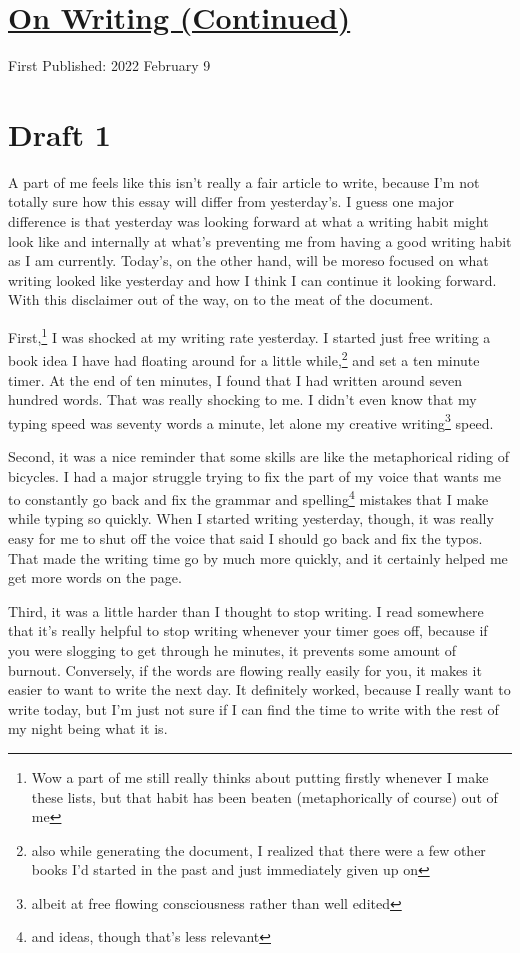 \documentclass[12pt]{article}[titlepage]
\newcommand{\1}{\={a}}
\newcommand{\2}{\={e}}
\newcommand{\3}{\={\i}}
\newcommand{\4}{\=o}
\newcommand{\5}{\=u}
\newcommand{\6}{\={A}}
\renewcommand{\,}{\textsuperscript{,}}
\begin{document}
\doublespacing
\section{\href{writing-2.html}{On Writing (Continued)}}
First Published: 2022 February 9

\section{Draft 1}
A part of me feels like this isn't really a fair article to write, because I'm not totally sure how this essay will differ from yesterday's.
I guess one major difference is that yesterday was looking forward at what a writing habit might look like and internally at what's preventing me from having a good writing habit as I am currently.
Today's, on the other hand, will be moreso focused on what writing looked like yesterday and how I think I can continue it looking forward.
With this disclaimer out of the way, on to the meat of the document.

First,\footnote{Wow a part of me still really thinks about putting firstly whenever I make these lists, but that habit has been beaten (metaphorically of course) out of me} I was shocked at my writing rate yesterday.
I started just free writing a book idea I have had floating around for a little while,\footnote{also while generating the document, I realized that there were a few other books I'd started in the past and just immediately given up on} and set a ten minute timer.
At the end of ten minutes, I found that I had written around seven hundred words.
That was really shocking to me.
I didn't even know that my typing speed was seventy words a minute, let alone my creative writing\footnote{albeit at free flowing consciousness rather than well edited} speed.

Second, it was a nice reminder that some skills are like the metaphorical riding of bicycles.
I had a major struggle trying to fix the part of my voice that wants me to constantly go back and fix the grammar and spelling\footnote{and ideas, though that's less relevant} mistakes that I make while typing so quickly.
When I started writing yesterday, though, it was really easy for me to shut off the voice that said I should go back and fix the typos.
That made the writing time go by much more quickly, and it certainly helped me get more words on the page.

Third, it was a little harder than I thought to stop writing.
I read somewhere that it's really helpful to stop writing whenever your timer goes off, because if you were slogging to get through he minutes, it prevents some amount of burnout.
Conversely, if the words are flowing really easily for you, it makes it easier to want to write the next day.
It definitely worked, because I really want to write today, but I'm just not sure if I can find the time to write with the rest of my night being what it is.
\end{document}
